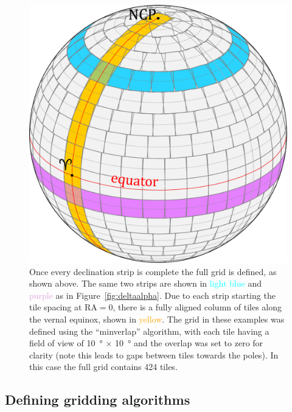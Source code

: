 \begin{colsection}
\begin{colsection}
\begin{figure}[p]
\begin{center}
\includegraphics[width=\linewidth]{images/globe4.pdf}
\end{center}
\caption[A fully tiled sphere]{Once every declination strip is complete the full grid is defined, as shown above. The same two strips are shown in \textcolor{cyan}{light blue} and \textcolor{Plum}{purple} as in Figure~\ref{fig:deltaalpha}. Due to each strip starting the tile spacing at RA$=0$, there is a fully aligned column of tiles along the vernal equinox, shown in \textcolor{orange}{yellow}. The grid in these examples was defined using the ``minverlap'' algorithm, with each tile having a field of view of \SI{10}{\degree} $\times$ \SI{10}{\degree} and the overlap was set to zero for clarity (note this leads to gaps between tiles towards the poles). In this case the full grid contains 424 tiles.
\\
}
\label{fig:tiledsphere}
\end{figure}

\newpage

\end{colsection}


\subsection{Defining gridding algorithms}
\label{sec:algorithms}
\begin{colsection}


\end{colsection}
\end{colsection}
